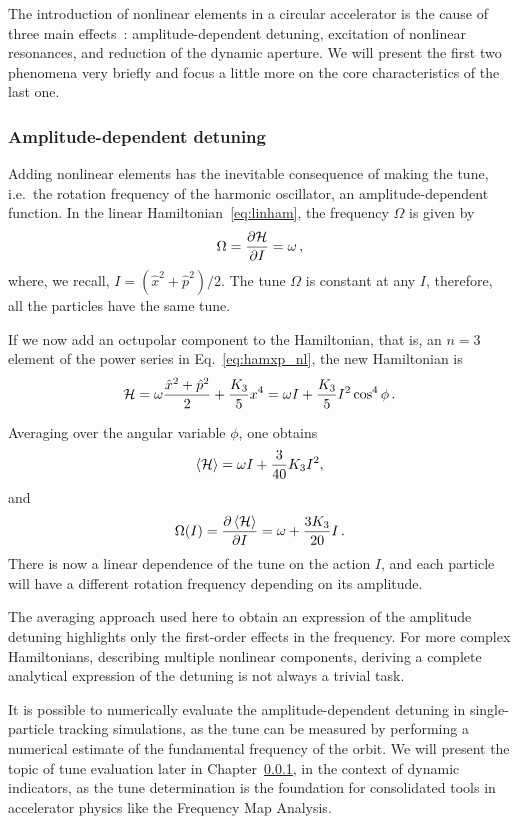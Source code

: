 The introduction of nonlinear elements in a circular accelerator is the cause of three main effects~\cite{herr}: amplitude-dependent detuning, excitation of nonlinear resonances, and reduction of the dynamic aperture. We will present the first two phenomena very briefly and focus a little more on the core characteristics of the last one.

\subsubsection{Amplitude-dependent detuning}

Adding nonlinear elements has the inevitable consequence of making the tune, i.e.\ the rotation frequency of the harmonic oscillator, an amplitude-dependent function. In the linear Hamiltonian~\eqref{eq:linham}, the frequency $\Omega$ is given by
\begin{equation}
	\Omega = \pdv{\mathcal{H}}{I} = \omega\,,
\end{equation}
where, we recall, $I=(\hat x^2 + \hat p^2)/2$. The tune $\Omega$ is constant at any $I$, therefore, all the particles have the same tune.

If we now add an octupolar component to the Hamiltonian, that is, an $n=3$ element of the power series in Eq.~\ref{eq:hamxp_nl}, the new Hamiltonian is
\begin{equation}
	\mathcal{H} = \omega \frac{\hat x^2 + \hat p^2}{2} + \frac{K_3}{5} x^4 = \omega I + \frac{K_3}{5} I^2 \cos^4\phi\, .
\end{equation}

Averaging over the angular variable $\phi$, one obtains
\begin{equation}
	\left<{\mathcal{H}}\right> = \omega I + \frac{3}{40}K_3 I^2,
\end{equation}
%
and
%
\begin{equation}
	\Omega(I) = \pdv{\left<{\mathcal{H}}\right>}{I} = \omega + \frac{3K_3}{20} I\,.
\end{equation}
There is now a linear dependence of the tune on the action $I$, and each particle will have a different rotation frequency depending on its amplitude.

The averaging approach used here to obtain an expression of the amplitude detuning highlights only the first-order effects in the frequency. For more complex Hamiltonians, describing multiple nonlinear components, deriving a complete analytical expression of the detuning is not always a trivial task.

It is possible to numerically evaluate the amplitude-dependent detuning in single-particle tracking simulations, as the tune can be measured by performing a numerical estimate of the fundamental frequency of the orbit. We will present the topic of tune evaluation later in Chapter~\ref{}, in the context of dynamic indicators, as the tune determination is the foundation for consolidated tools in accelerator physics like the Frequency Map Analysis.

